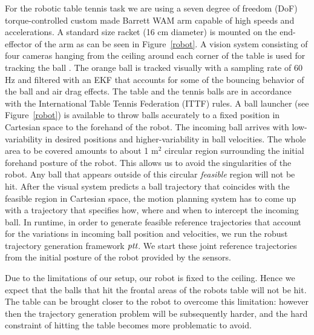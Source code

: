 \documentclass[letterpaper, 10 pt, conference]{ieeeconf}
\newcommand{\alg}{\emph{ptt}} %
\begin{document}
For the robotic table tennis task we are using a seven degree of freedom (DoF) torque-controlled custom made Barrett WAM arm capable of high speeds and accelerations. A standard size racket (16 cm diameter) is mounted on the end-effector of the arm as can be seen in Figure~\ref{robot}. A vision system consisting of four cameras hanging from the ceiling around each corner of the table is used for tracking the ball \cite{Lampert12}. The orange ball is tracked visually with a sampling rate of 60 Hz and filtered with an EKF that accounts for some of the bouncing behavior of the ball and air drag effects. The table and the tennis balls are in accordance with the International Table Tennis Federation (ITTF) rules.
%
A ball launcher (see Figure~\ref{robot}) is available to throw balls accurately to a fixed position in Cartesian space to the forehand of the robot. The incoming ball arrives with low-variability in desired positions and higher-variability in ball velocities. The whole area to be covered amounts to about 1 m$^2$ circular region surrounding the initial forehand posture of the robot. This allows us to avoid the singularities of the robot. Any ball that appears outside of this circular \emph{feasible} region will not be hit.
%
After the visual system predicts a ball trajectory that coincides with the feasible region in Cartesian space, the motion planning system has to come up with a trajectory that specifies how, where and when to intercept the incoming ball. 
%
In runtime, in order to generate feasible reference trajectories that account for the variations in incoming ball position and velocities, we run the robust trajectory generation framework $\alg$. We start these joint reference trajectories from the initial posture of the robot provided by the sensors.

Due to the limitations of our setup, our robot is fixed to the ceiling. Hence we expect that the balls that hit the frontal areas of the robots table will not be hit. The table can be brought closer to the robot to overcome this limitation: however then the trajectory generation problem will be subsequently harder, and the hard constraint of hitting the table becomes more problematic to avoid.
\end{document}
